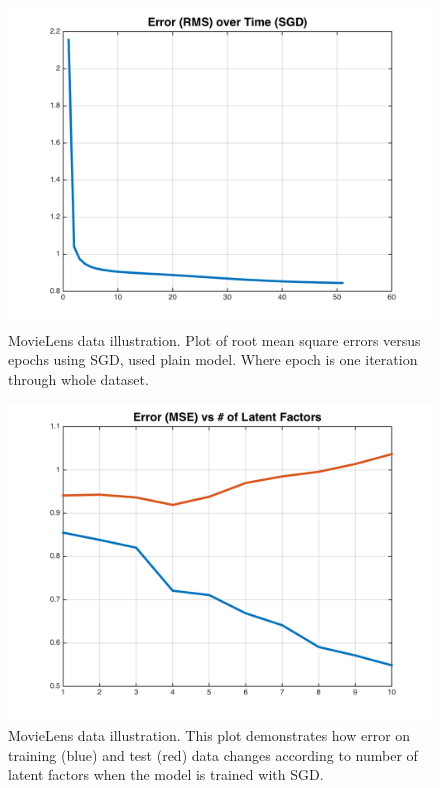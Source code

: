 \documentclass[11pt]{article}
\begin{document}
	\begin{figure}[H]
		\centering		
		\includegraphics[width=\wi]{buff5/3_on_reg01}
		\caption{MovieLens data illustration. Plot of root mean square errors versus epochs using SGD, used plain model. Where epoch is one iteration through whole dataset.}
		\label{5}		
	\end{figure}
	\begin{figure}[H]
		\centering		
		\includegraphics[width=\wi]{buff5/l_sgd}
		\caption{MovieLens data illustration. This plot demonstrates how error on training (blue) and test (red) data changes according to number of latent factors when the model is trained with SGD. }
		\label{5}		
	\end{figure}	
\end{document}
